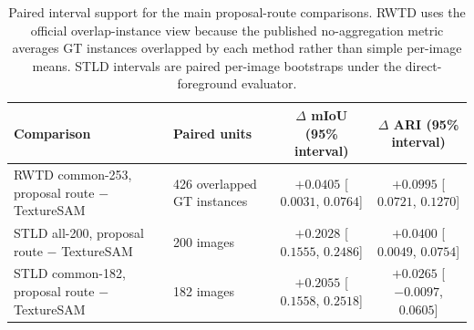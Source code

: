 \begin{table}[t]
\centering
\scriptsize
\setlength{\tabcolsep}{5pt}
\renewcommand{\arraystretch}{0.98}
\begin{tabularx}{\textwidth}{@{}p{}p{}cc@{}}
\toprule
Comparison & Paired units & $\Delta$ mIoU (95\% interval) & $\Delta$ ARI (95\% interval) \\
\midrule
RWTD common-253, proposal route $-$ TextureSAM & 426 overlapped GT instances & $+0.0405$ [$0.0031$, $0.0764$] & $+0.0995$ [$0.0721$, $0.1270$] \\
STLD all-200, proposal route $-$ TextureSAM & 200 images & $+0.2028$ [$0.1555$, $0.2486$] & $+0.0400$ [$0.0049$, $0.0754$] \\
STLD common-182, proposal route $-$ TextureSAM & 182 images & $+0.2055$ [$0.1558$, $0.2518$] & $+0.0265$ [$-0.0097$, $0.0605$] \\
\bottomrule
\end{tabularx}
\caption{Paired interval support for the main proposal-route comparisons. RWTD uses the official overlap-instance view because the published no-aggregation metric averages GT instances overlapped by each method rather than simple per-image means. STLD intervals are paired per-image bootstraps under the direct-foreground evaluator.}
\label{tab:bootstrap_support}
\end{table}

